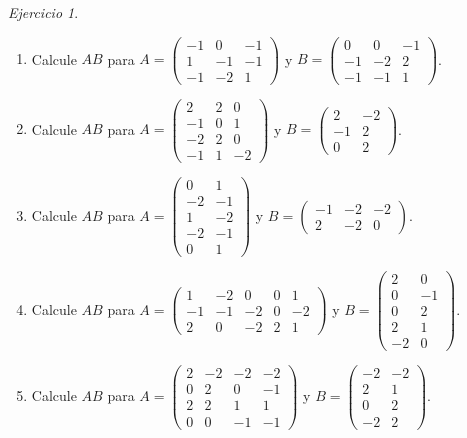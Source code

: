 \documentclass[12pt]{article}
\theoremstyle{remark}
\newtheorem{Ejer}[definicion]{Ejercicio}
\begin{document}
\begin{Ejer}
\begin{enumerate}[start=113]
\item Calcule $AB$ para $A=\begin{pmatrix}-1&0&-1\\1&-1&-1\\-1&-2&1\end{pmatrix}$ y $B=\begin{pmatrix}0&0&-1\\-1&-2&2\\-1&-1&1\end{pmatrix}$.

\item Calcule $AB$ para $A=\begin{pmatrix}2&2&0\\-1&0&1\\-2&2&0\\-1&1&-2\end{pmatrix}$ y $B=\begin{pmatrix}2&-2\\-1&2\\0&2\end{pmatrix}$.

\item Calcule $AB$ para $A=\begin{pmatrix}0&1\\-2&-1\\1&-2\\-2&-1\\0&1\end{pmatrix}$ y $B=\begin{pmatrix}-1&-2&-2\\2&-2&0\end{pmatrix}$.

\item Calcule $AB$ para $A=\begin{pmatrix}1&-2&0&0&1\\-1&-1&-2&0&-2\\2&0&-2&2&1\end{pmatrix}$ y $B=\begin{pmatrix}2&0\\0&-1\\0&2\\2&1\\-2&0\end{pmatrix}$.

\item Calcule $AB$ para $A=\begin{pmatrix}2&-2&-2&-2\\0&2&0&-1\\2&2&1&1\\0&0&-1&-1\end{pmatrix}$ y $B=\begin{pmatrix}-2&-2\\2&1\\0&2\\-2&2\end{pmatrix}$.


\end{enumerate}
\end{Ejer}
\end{document}
